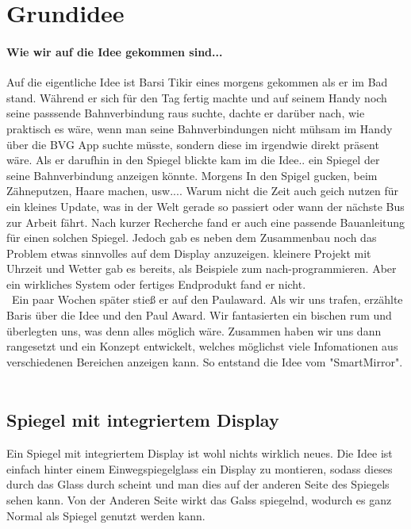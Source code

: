 \section{Grundidee}
\paragraph{Wie wir auf die Idee gekommen sind...}
Auf die eigentliche Idee ist Barsi Tikir eines morgens gekommen als er im Bad stand. Während er sich für den Tag fertig machte und auf seinem Handy noch seine passsende Bahnverbindung raus suchte, dachte er darüber nach, wie praktisch es wäre, wenn man seine Bahnverbindungen nicht mühsam im Handy über die BVG App suchte müsste, sondern diese im irgendwie direkt präsent wäre. Als er darufhin in den Spiegel blickte kam im die Idee.. ein Spiegel  der seine Bahnverbindung anzeigen könnte. Morgens In den Spigel gucken, beim Zähneputzen, Haare machen, usw.... Warum nicht die Zeit auch geich nutzen für ein kleines Update, was in der Welt gerade so passiert oder wann der nächste Bus zur Arbeit fährt. Nach kurzer Recherche fand er auch eine passende Bauanleitung für einen solchen Spiegel. Jedoch gab es neben dem Zusammenbau noch das Problem etwas  sinnvolles auf dem Display anzuzeigen. kleinere Projekt mit Uhrzeit und Wetter gab es bereits, als Beispiele zum nach-programmieren. Aber ein wirkliches System oder fertiges Endprodukt fand er nicht.
\\\
Ein paar Wochen später stieß er auf den Paulaward. Als wir uns trafen, erzählte Baris über die Idee und den Paul Award. Wir fantasierten ein bischen rum und überlegten uns, was denn alles möglich wäre. Zusammen haben wir uns dann rangesetzt und ein Konzept entwickelt, welches möglichst viele Infomationen aus verschiedenen Bereichen anzeigen kann. So entstand die Idee vom "SmartMirror".\\\

\subsection{Spiegel mit integriertem Display}
Ein Spiegel mit integriertem Display ist wohl nichts wirklich neues. Die Idee ist einfach hinter einem Einwegspiegelglass ein Display zu montieren, sodass dieses durch das Glass durch scheint und man dies auf der anderen Seite des Spiegels sehen kann. Von der Anderen Seite wirkt das Galss spiegelnd, wodurch es ganz Normal als Spiegel genutzt werden kann.
